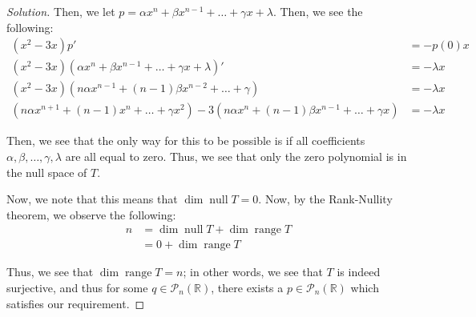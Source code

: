 \documentclass{article}
\newenvironment{solution}{\begin{proof}[Solution]}{\end{proof}}
\newcommand{\RR}{\mathbb{R}}
\DeclareMathOperator*{\vnull}{\mathrm{null}}
\DeclareMathOperator*{\vrange}{\mathrm{range}}
\begin{document}
\begin{solution}
		Then, we let $p = \alpha x^{n} + \beta x^{n-1} + \ldots + \gamma x + \lambda$. Then, we see the following:
		\begin{align*}
			(x^{2} - 3x)p' &= -p(0)x \\
			(x^{2} - 3x)(\alpha x^{n} + \beta x^{n-1} + \ldots + \gamma x + \lambda)' &= -\lambda x \\
			(x^{2} - 3x)(n \alpha x^{n-1} + (n-1)\beta x^{n-2} + \ldots + \gamma) &= -\lambda x \\
			(n\alpha x^{n+1} + (n-1)x^{n} + \ldots + \gamma x^{2}) - 3(n \alpha x^{n} + (n-1)\beta x^{n-1} + \ldots + \gamma x) &= - \lambda x
		\end{align*}
	
		Then, we see that the only way for this to be possible is if all coefficients $\alpha, \beta, \ldots, \gamma, \lambda$ are all equal to zero. Thus, we see that only the zero polynomial is in the null space of $T$.
		
		Now, we note that this means that $\dim \vnull T = 0$. Now, by the Rank-Nullity theorem, we observe the following:
		\begin{align*}
			n &= \dim \vnull T + \dim\vrange T \\
			&= 0 + \dim\vrange T 
		\end{align*}
	
		Thus, we see that $\dim\vrange T = n$; in other words, we see that $T$ is indeed surjective, and thus for some $q \in \mathscr{P}_{n}(\RR)$, there exists a $p \in \mathscr{P}_{n}(\RR)$ which satisfies our requirement.
	\end{solution}
	
	\newpage
	
\end{document}
